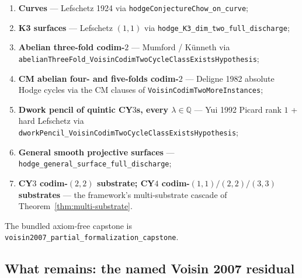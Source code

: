 \documentclass[11pt,a4paper]{article}
\theoremstyle{plain}
\theoremstyle{definition}
\begin{document}
\begin{enumerate}[label=\arabic*.,leftmargin=*]
\item \textbf{Curves} --- Lefschetz 1924 via
\texttt{hodgeConjectureChow\_on\_curve};

\item \textbf{K3 surfaces} --- Lefschetz $(1,1)$ via
\texttt{hodge\_K3\_dim\_two\_full\_discharge};

\item \textbf{Abelian three-fold codim-$2$} --- Mumford / K\"unneth
via \texttt{abelianThreeFold\_VoisinCodimTwoCycleClassExistsHypothesis};

\item \textbf{CM abelian four- and five-folds codim-$2$} --- Deligne
1982 absolute Hodge cycles via the CM clauses of
\texttt{VoisinCodimTwoMoreInstances};

\item \textbf{Dwork pencil of quintic CY$3$s, every $\lambda \in
\mathbb{Q}$} --- Yui 1992 Picard rank $1$ + hard Lefschetz via
\texttt{dworkPencil\_VoisinCodimTwoCycleClassExistsHypothesis};

\item \textbf{General smooth projective surfaces} ---
\texttt{hodge\_general\_surface\_full\_discharge};

\item \textbf{CY$3$ codim-$(2,2)$ substrate; CY$4$ codim-$(1,1)/(2,2)
/(3,3)$ substrates} --- the framework's multi-substrate cascade of
Theorem~\ref{thm:multi-substrate}.
\end{enumerate}

The bundled axiom-free capstone is
\texttt{voisin2007\_partial\_formalization\_capstone}.

\subsection{What remains: the named Voisin 2007 residual}
\end{document}
